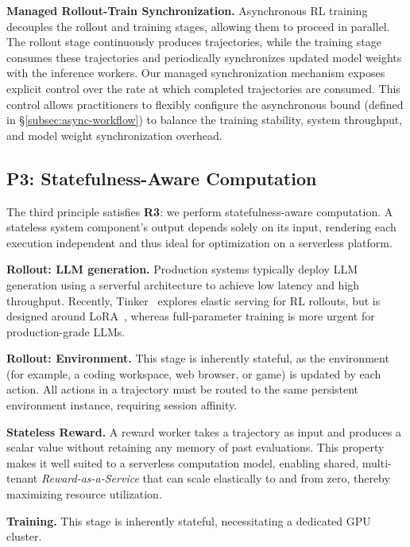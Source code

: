 \noindent\textbf{Managed Rollout-Train Synchronization.}
Asynchronous RL training decouples the rollout and training stages, allowing them to proceed in parallel. The rollout stage continuously produces trajectories, while the training stage consumes these trajectories and periodically synchronizes updated model weights with the inference workers. Our managed synchronization mechanism exposes explicit control over the rate at which completed trajectories are consumed. 
This control allows practitioners to flexibly configure the asynchronous bound (defined in \S\ref{subsec:async-workflow}) to balance the training stability, system throughput, and model weight synchronization overhead. 



\subsection{P3: Statefulness-Aware Computation}
The third principle satisfies \textbf{R3}: we perform statefulness-aware computation. A stateless system component's output depends solely on its input, rendering each execution independent and thus ideal for optimization on a serverless platform.




\noindent\textbf{Rollout: LLM generation.} Production systems typically deploy LLM generation using a serverful architecture to achieve low latency and high throughput. Recently, Tinker~\cite{tml2025tinker} explores elastic serving for RL rollouts, but is designed around LoRA~\cite{hu2021loralowrankadaptationlarge}, whereas full-parameter training is more urgent for production-grade LLMs. 





\noindent\textbf{Rollout: Environment.} This stage is inherently stateful, as the environment (for example, a coding workspace, web browser, or game) is updated by each action. All actions in a trajectory must be routed to the same persistent environment instance, requiring session affinity.


\noindent\textbf{Stateless Reward.} A reward worker takes a trajectory as input and produces a scalar value without retaining any memory of past evaluations. This property makes it well suited to a serverless computation model, enabling shared, multi-tenant \textit{Reward-as-a-Service} that can scale elastically to and from zero, thereby maximizing resource utilization.


\noindent\textbf{Training.} This stage is inherently stateful, necessitating a dedicated GPU cluster. 


